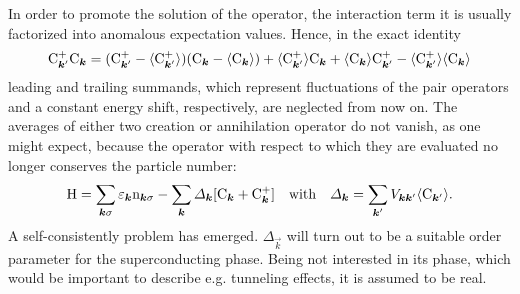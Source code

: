 In order to promote the solution of the  operator, the
interaction term it is usually factorized into anomalous expectation values.
Hence, in the exact identity \cite[Eq.~4.20]{Nolting15}
%
\begin{equation*}
	\mathrm C_{\boldsymbol k'}^+ \mathrm C_{\boldsymbol k} =
    (\mathrm C_{\boldsymbol k'}^+ - \langle\mathrm C_{\boldsymbol k'}^+\rangle)
    (\mathrm C_{\boldsymbol k} - \langle\mathrm C_{\boldsymbol k}\rangle)
    + \langle\mathrm C_{\boldsymbol k'}^+\rangle \mathrm C_{\boldsymbol k}
    + \langle\mathrm C_{\boldsymbol k}\rangle \mathrm C_{\boldsymbol k'}^+
    - \langle\mathrm C_{\boldsymbol k'}^+\rangle \langle\mathrm C_{\boldsymbol k}\rangle
\end{equation*}
%
leading and trailing summands, which represent fluctuations of the 
pair operators and a constant energy shift, respectively, are neglected from now
on. The averages of either two creation or annihilation operator do not vanish,
as one might expect, because the  operator with respect to which
they are evaluated no longer conserves the particle number:
%
\begin{equation} \label{BCS order parameter}
    \mathrm H = \sum_{\boldsymbol k \sigma} \varepsilon_{\boldsymbol k} \mathrm n_{\boldsymbol k \sigma}
    - \sum_{\boldsymbol k} \varDelta_{\boldsymbol k} [\mathrm C_{\boldsymbol k} + \mathrm C_{\boldsymbol k}^+]
    \quad \text{with} \quad
    \varDelta_{\boldsymbol k} = \sum_{\boldsymbol k'} V_{\boldsymbol k \boldsymbol k'} \langle\mathrm C_{\boldsymbol k'}\rangle.
\end{equation}
%
A self-consistently problem has emerged. $\Delta_{\vec k}$ will turn out to be a
suitable order parameter for the superconducting phase. Being not interested in
its phase, which would be important to describe e.g. tunneling effects, it is
assumed to be real.

